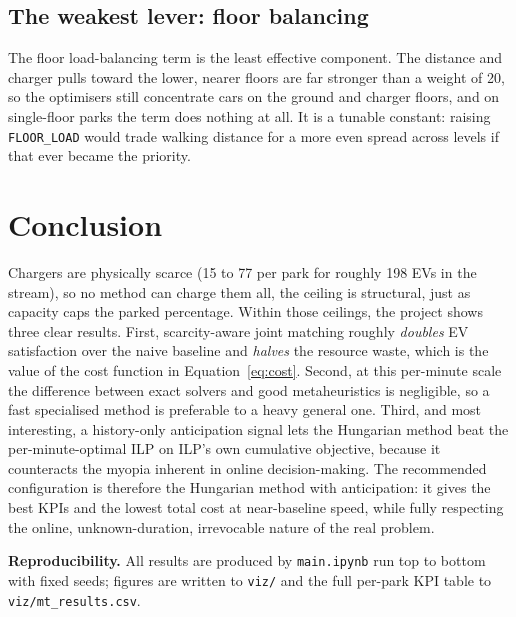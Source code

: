 \documentclass[11pt,a4paper]{article}
\newcommand{\code}[1]{\texttt{\small #1}}
\begin{document}
\subsection{The weakest lever: floor balancing}

The floor load-balancing term is the least effective component. The distance and charger
pulls toward the lower, nearer floors are far stronger than a weight of 20, so the
optimisers still concentrate cars on the ground and charger floors, and on single-floor
parks the term does nothing at all. It is a tunable constant: raising \code{FLOOR\_LOAD}
would trade walking distance for a more even spread across levels if that ever became the
priority.

\section{Conclusion}

Chargers are physically scarce (15 to 77 per park for roughly 198 EVs in the stream), so
no method can charge them all, the ceiling is structural, just as capacity caps the
parked percentage. Within those ceilings, the project shows three clear results. First,
scarcity-aware joint matching roughly \emph{doubles} EV satisfaction over the naive
baseline and \emph{halves} the resource waste, which is the value of the cost function in
Equation~\eqref{eq:cost}. Second, at this per-minute scale the difference between exact
solvers and good metaheuristics is negligible, so a fast specialised method is preferable
to a heavy general one. Third, and most interesting, a history-only anticipation signal
lets the Hungarian method beat the per-minute-optimal ILP on ILP's own cumulative
objective, because it counteracts the myopia inherent in online decision-making. The
recommended configuration is therefore the Hungarian method with anticipation: it gives
the best KPIs and the lowest total cost at near-baseline speed, while fully respecting the
online, unknown-duration, irrevocable nature of the real problem.

\vspace{0.8cm}
\noindent\textbf{Reproducibility.} All results are produced by \code{main.ipynb} run top
to bottom with fixed seeds; figures are written to \code{viz/} and the full per-park KPI
table to \code{viz/mt\_results.csv}.
\end{document}
